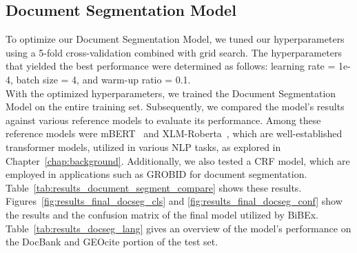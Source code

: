 \subsection{Document Segmentation Model}\label{sec:eval_docseg}
To optimize our Document Segmentation Model, we tuned our hyperparameters using a 5-fold cross-validation combined with grid search. The hyperparameters that yielded the best performance were determined as follows: learning rate = 1e-4, batch size = 4, and warm-up ratio = 0.1.\\
With the optimized hyperparameters, we trained the Document Segmentation Model on the entire training set. Subsequently, we compared the model's results against various reference models to evaluate its performance. Among these reference models were mBERT~\cite{hug_cased_bert} and XLM-Roberta~\cite{hug_xlmr}, which are well-established transformer models, utilized in various NLP tasks, as explored in Chapter~\ref{chap:background}. Additionally, we also tested a CRF model, which are employed in applications such as GROBID for document segmentation.\\
Table~\ref{tab:results_document_segment_compare} shows these results. Figures~\ref{fig:results_final_docseg_cls} and \ref{fig:results_final_docseg_conf} show the results and the confusion matrix of the final model utilized by BiBEx. Table~\ref{tab:results_docseg_lang} gives an overview of the model's performance on the DocBank and GEOcite portion of the test set.

